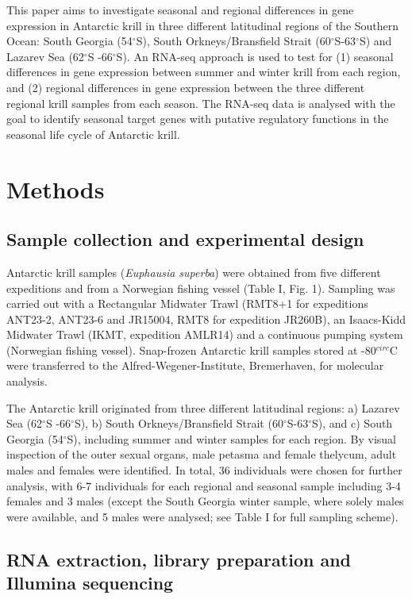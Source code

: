 This paper aims to investigate seasonal and regional differences in gene
expression in Antarctic krill in three different latitudinal regions of the
Southern Ocean: South Georgia (54$^{\circ}$S), South Orkneys/Bransfield Strait
(60$^{\circ}$S-63$^{\circ}$S) and Lazarev Sea (62$^{\circ}$S -66$^{\circ}$S). An
RNA-seq approach is used to test for (1) seasonal differences in gene
expression between summer and winter krill from each region, and (2) regional
differences in gene expression between the three different regional krill
samples from each season. The RNA-seq data is analysed with the goal to
identify seasonal target genes with putative regulatory functions in the
seasonal life cycle of Antarctic krill.

\section{Methods}

\subsection*{Sample collection and experimental design}

Antarctic krill samples (\textit{Euphausia superba}) were obtained from five
different expeditions and from a Norwegian fishing vessel (Table I, Fig. 1).
Sampling was carried out with a Rectangular Midwater Trawl (RMT8+1 for
expeditions ANT23-2, ANT23-6 and JR15004, RMT8 for expedition JR260B), an
Isaacs-Kidd Midwater Trawl (IKMT, expedition AMLR14) and a continuous pumping
system (Norwegian fishing vessel). Snap-frozen Antarctic krill samples stored
at -80$^{circ}$C were transferred to the Alfred-Wegener-Institute, Bremerhaven,
for molecular analysis.

The Antarctic krill originated from three different latitudinal regions:
a) Lazarev Sea (62$^{\circ}$S -66$^{\circ}$S), b) South
Orkneys/Bransfield Strait (60$^{\circ}$S-63$^{\circ}$S), and c) South
Georgia (54$^{\circ}$S), including summer and winter samples for each region.
By visual inspection of the outer sexual organs, male petasma and female
thelycum, adult males and females were identified. In total, 36 individuals
were chosen for further analysis, with 6-7 individuals for each regional and
seasonal sample including 3-4 females and 3 males (except the South Georgia
winter sample, where solely males were available, and 5 males were analysed;
see Table I for full sampling scheme).

\subsection*{RNA extraction, library preparation and Illumina sequencing}

